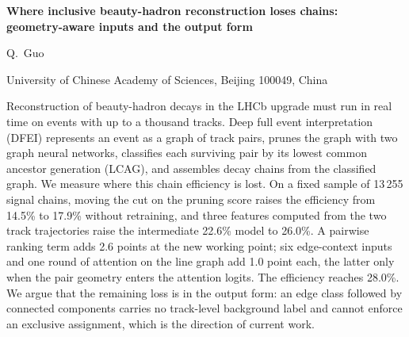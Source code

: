 \documentclass[10pt]{article}
\begin{document}
\begin{center}
{\LARGE\bfseries Where inclusive beauty-hadron reconstruction loses chains:\\[2pt] geometry-aware inputs and the output form\par}
\vspace{0.9em}
{\large Q.~Guo\par}
\vspace{0.35em}
{\small University of Chinese Academy of Sciences, Beijing 100049, China\par}
\end{center}

\vspace{0.3em}
\begin{center}
\begin{minipage}{0.84\textwidth}
Reconstruction of beauty-hadron decays in the LHCb upgrade must run in real time on events with up to a thousand tracks. Deep full event interpretation (DFEI) represents an event as a graph of track pairs, prunes the graph with two graph neural networks, classifies each surviving pair by its lowest common ancestor generation (LCAG), and assembles decay chains from the classified graph. We measure where this chain efficiency is lost. On a fixed sample of 13\,255 signal chains, moving the cut on the pruning score raises the efficiency from 14.5\% to 17.9\% without retraining, and three features computed from the two track trajectories raise the intermediate 22.6\% model to 26.0\%. A pairwise ranking term adds 2.6 points at the new working point; six edge-context inputs and one round of attention on the line graph add 1.0 point each, the latter only when the pair geometry enters the attention logits. The efficiency reaches 28.0\%. We argue that the remaining loss is in the output form: an edge class followed by connected components carries no track-level background label and cannot enforce an exclusive assignment, which is the direction of current work.
\end{minipage}
\end{center}
\end{document}
